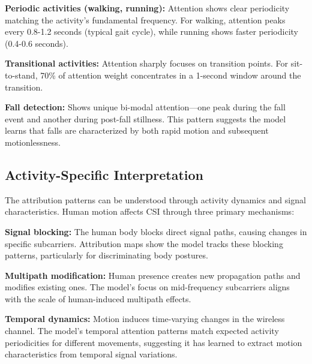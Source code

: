 \documentclass[lettersize,journal]{IEEEtran}
\begin{document}
\textbf{Periodic activities (walking, running):} Attention shows clear periodicity matching the activity's fundamental frequency. For walking, attention peaks every 0.8-1.2 seconds (typical gait cycle), while running shows faster periodicity (0.4-0.6 seconds).

\textbf{Transitional activities:} Attention sharply focuses on transition points. For sit-to-stand, 70\% of attention weight concentrates in a 1-second window around the transition.

\textbf{Fall detection:} Shows unique bi-modal attention—one peak during the fall event and another during post-fall stillness. This pattern suggests the model learns that falls are characterized by both rapid motion and subsequent motionlessness.

\subsection{Activity-Specific Interpretation}

The attribution patterns can be understood through activity dynamics and signal characteristics. Human motion affects CSI through three primary mechanisms:

\textbf{Signal blocking:} The human body blocks direct signal paths, causing changes in specific subcarriers. Attribution maps show the model tracks these blocking patterns, particularly for discriminating body postures.

\textbf{Multipath modification:} Human presence creates new propagation paths and modifies existing ones. The model's focus on mid-frequency subcarriers aligns with the scale of human-induced multipath effects.

\textbf{Temporal dynamics:} Motion induces time-varying changes in the wireless channel. The model's temporal attention patterns match expected activity periodicities for different movements, suggesting it has learned to extract motion characteristics from temporal signal variations.
\end{document}
